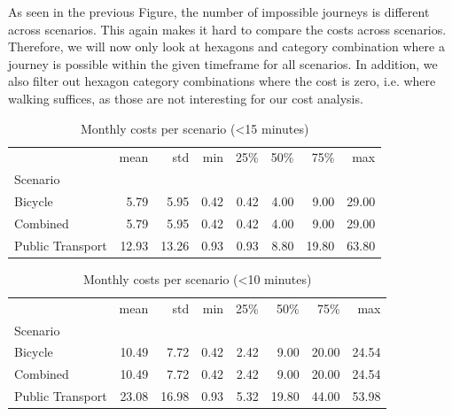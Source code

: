 As seen in the previous Figure, the number of impossible journeys is different across scenarios.
This again makes it hard to compare the costs across scenarios.
Therefore, we will now only look at hexagons and category combination where a journey is possible within the given timeframe for all scenarios.
In addition, we also filter out hexagon category combinations where the cost is zero, i.e. where walking suffices, as those are not interesting for our cost analysis.

\begin{table}
  \caption{Monthly costs per scenario (<15 minutes)}
  \label{tab:monthly_costs_per_scenario_15}
  \begin{center}
    \begin{tabular}{lrrrrrrr}
     & mean & std & min & 25\% & 50\% & 75\% & max \\
    Scenario &  &  &  &  &  &  &  \\
    Bicycle & 5.79 & 5.95 & 0.42 & 0.42 & 4.00 & 9.00 & 29.00 \\
    Combined & 5.79 & 5.95 & 0.42 & 0.42 & 4.00 & 9.00 & 29.00 \\
    Public Transport & 12.93 & 13.26 & 0.93 & 0.93 & 8.80 & 19.80 & 63.80 \\
    \end{tabular}
  \end{center}
\end{table}


\begin{table}
  \caption{Monthly costs per scenario (<10 minutes)}
  \label{tab:monthly_costs_per_scenario_10}
  \begin{center}
    \begin{tabular}{lrrrrrrr}
     & mean & std & min & 25\% & 50\% & 75\% & max \\
    Scenario &  &  &  &  &  &  &  \\
    Bicycle & 10.49 & 7.72 & 0.42 & 2.42 & 9.00 & 20.00 & 24.54 \\
    Combined & 10.49 & 7.72 & 0.42 & 2.42 & 9.00 & 20.00 & 24.54 \\
    Public Transport & 23.08 & 16.98 & 0.93 & 5.32 & 19.80 & 44.00 & 53.98 \\
    \end{tabular}
  \end{center}
\end{table}

